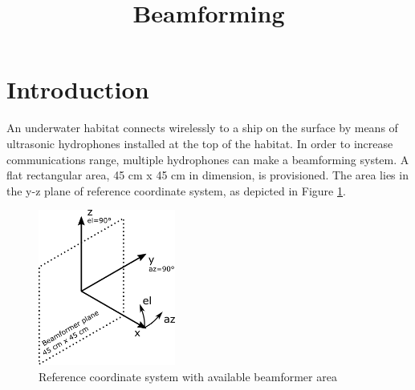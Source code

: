 \documentclass{article}[a4paper]
\title{Beamforming}
\begin{document}
\maketitle

\section*{Introduction}

An underwater habitat connects wirelessly to a ship on the surface by means of ultrasonic hydrophones installed at the top of the habitat. In order to increase communications range, multiple hydrophones can make a beamforming system. A flat rectangular area, 45 cm x 45 cm in dimension, is provisioned. The area lies in the y-z plane of reference coordinate system, as depicted in Figure \ref{fig:coord}.
\begin{figure}[h!]
   \centering
   \includegraphics[width=0.4\textwidth]{coord.png}
   \caption{Reference coordinate system with available beamformer area}
   \label{fig:coord}
\end{figure}
\end{document}
